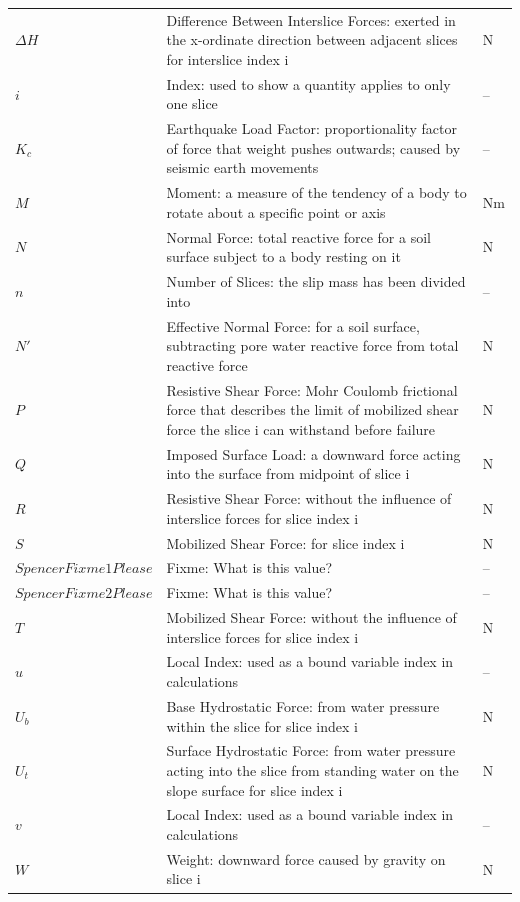 \documentclass[12pt]{article}
\begin{document}
\begin{longtabu}{l X[l] l}
\\
$ΔH$ & Difference Between Interslice Forces: exerted in the x-ordinate direction between adjacent slices for interslice index i & N
\\
$i$ & Index: used to show a quantity applies to only one slice & --
\\
${K_{c}}$ & Earthquake Load Factor: proportionality factor of force that weight pushes outwards; caused by seismic earth movements & --
\\
$M$ & Moment: a measure of the tendency of a body to rotate about a specific point or axis & Nm
\\
$N$ & Normal Force: total reactive force for a soil surface subject to a body resting on it & N
\\
$n$ & Number of Slices: the slip mass has been divided into & --
\\
$N'$ & Effective Normal Force: for a soil surface, subtracting pore water reactive force from total reactive force & N
\\
$P$ & Resistive Shear Force: Mohr Coulomb frictional force that describes the limit of mobilized shear force the slice i can withstand before failure & N
\\
$Q$ & Imposed Surface Load: a downward force acting into the surface from midpoint of slice i & N
\\
$R$ & Resistive Shear Force: without the influence of interslice forces for slice index i & N
\\
$S$ & Mobilized Shear Force: for slice index i & N
\\
$SpencerFixme1Please$ & Fixme: What is this value? & --
\\
$SpencerFixme2Please$ & Fixme: What is this value? & --
\\
$T$ & Mobilized Shear Force: without the influence of interslice forces for slice index i & N
\\
$u$ & Local Index: used as a bound variable index in calculations & --
\\
${U_{b}}$ & Base Hydrostatic Force: from water pressure within the slice for slice index i & N
\\
${U_{t}}$ & Surface Hydrostatic Force: from water pressure acting into the slice from standing water on the slope surface for slice index i & N
\\
$v$ & Local Index: used as a bound variable index in calculations & --
\\
$W$ & Weight: downward force caused by gravity on slice i & N
\\

\end{longtabu}
\end{document}
